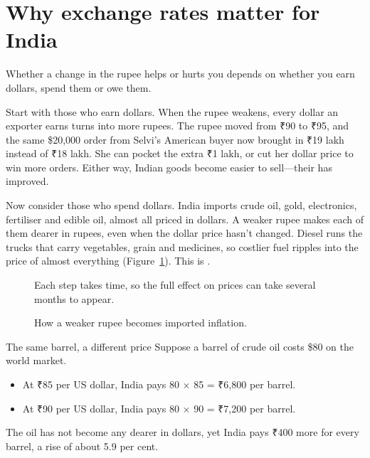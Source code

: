 \section{Why exchange rates matter for India}\label{sec:matters}

Whether a change in the rupee helps or hurts you depends on whether you earn dollars, spend them or owe them.

Start with those who earn dollars. When the rupee weakens, every dollar an exporter earns turns into more rupees. The rupee moved from ₹90 to ₹95, and the same \$20,000 order from Selvi's American buyer now brought in ₹19 lakh instead of ₹18 lakh. She can pocket the extra ₹1 lakh, or cut her dollar price to win more orders. Either way, Indian goods become easier to sell---their  has improved.

Now consider those who spend dollars. India imports crude oil, gold, electronics, fertiliser and edible oil, almost all priced in dollars. A weaker rupee makes each of them dearer in rupees, even when the dollar price hasn't changed. Diesel runs the trucks that carry vegetables, grain and medicines, so costlier fuel ripples into the price of almost everything (Figure~\ref{fig:inflation}). This is .

\begin{figure}[!htb]
  \centering
  \resizebox{\linewidth}{!}{}
  \caption{How a weaker rupee becomes imported inflation.}
  \label{fig:inflation}
  {\raggedright\small\sffamily Each step takes time, so the full effect on prices can take several months to appear.\par}

\end{figure}

\begin{workedexample}{The same barrel, a different price}
Suppose a barrel of crude oil costs \$80 on the world market.
\begin{itemize}
  \item At ₹85 per US dollar, India pays 80 × 85 = ₹6,800 per barrel.
  \item At ₹90 per US dollar, India pays 80 × 90 = ₹7,200 per barrel.
\end{itemize}
The oil has not become any dearer in dollars, yet India pays ₹400 more for every barrel, a rise of about 5.9 per cent.
\end{workedexample}

